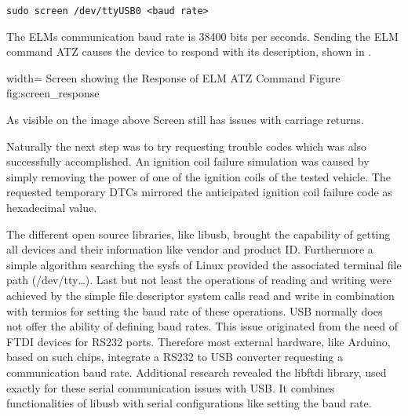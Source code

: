 \begin{verbatim}
sudo screen /dev/ttyUSB0 <baud rate> 
\end{verbatim}

The ELMs communication baud rate is 38400 bits per seconds. Sending the ELM command ATZ causes the device to respond with its description, shown in .

 {width=\textwidth}%
 {Screen showing the Response of ELM ATZ Command}%
 {Figure}%
 {fig:screen_response}%

As visible on the image above Screen still has issues with carriage returns.

Naturally the next step was to try requesting trouble codes which was also successfully accomplished. An ignition coil failure simulation was 
caused by simply removing the power of one of the ignition coils of the tested vehicle. The requested temporary DTCs mirrored the anticipated 
ignition coil failure code as hexadecimal value. 


The different open source libraries, like libusb, brought the capability of getting all devices and their information like vendor and product ID.
Furthermore a simple algorithm searching the sysfs of Linux provided the associated terminal file path (/dev/tty…). Last but not least the 
operations of reading and writing were achieved by the simple file descriptor system calls read and write in combination with termios for 
setting the baud rate of these operations. USB normally does not offer the ability of defining baud rates. This issue originated from the need 
of FTDI devices for RS232 ports. Therefore most external hardware, like Arduino, based on such chips, integrate a RS232 to USB converter 
requesting a communication baud rate. Additional research revealed the libftdi library, used exactly for these serial communication issues with 
USB. It combines functionalities of libusb with serial configurations like setting the baud rate. 

